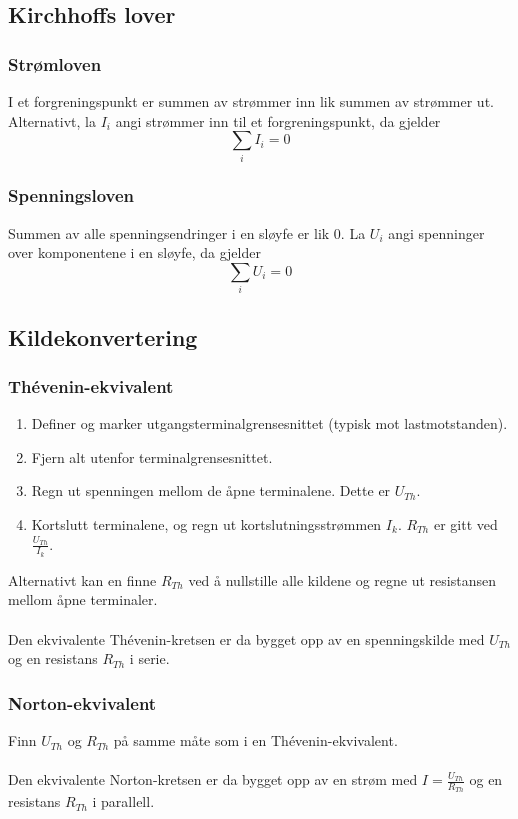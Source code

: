 \documentclass{article}
\begin{document}
\subsection{Kirchhoffs lover}
\subsubsection{Strømloven}
I et forgreningspunkt er summen av strømmer inn lik summen av strømmer ut. Alternativt, la $I_i$ angi strømmer inn til et forgreningspunkt, da gjelder
\[\sum_i I_i = 0\]
\subsubsection{Spenningsloven}
Summen av alle spenningsendringer i en sløyfe er lik 0. La $U_i$ angi spenninger over komponentene i en sløyfe, da gjelder
\[\sum_i U_i = 0\]

\subsection{Kildekonvertering}
\subsubsection{Thévenin-ekvivalent}
\begin{enumerate}
    \item Definer og marker utgangsterminalgrensesnittet (typisk mot lastmotstanden).
    \item Fjern alt utenfor terminalgrensesnittet.
    \item Regn ut spenningen mellom de åpne terminalene. Dette er $U_{Th}$.
    \item Kortslutt terminalene, og regn ut kortslutningsstrømmen $I_k$. $R_{Th}$ er gitt ved $\frac{U_{Th}}{I_k}$.
\end{enumerate}
Alternativt kan en finne $R_{Th}$ ved å nullstille alle kildene og regne ut resistansen mellom åpne terminaler.\\\\
Den ekvivalente Thévenin-kretsen er da bygget opp av en spenningskilde med $U_{Th}$ og en resistans $R_{Th}$ i serie.

\subsubsection{Norton-ekvivalent}
Finn $U_{Th}$ og $R_{Th}$ på samme måte som i en Thévenin-ekvivalent. \\\\
Den ekvivalente Norton-kretsen er da bygget opp av en strøm med $I = \frac{U_{Th}}{R_{Th}}$ og en resistans $R_{Th}$ i parallell.
\end{document}
